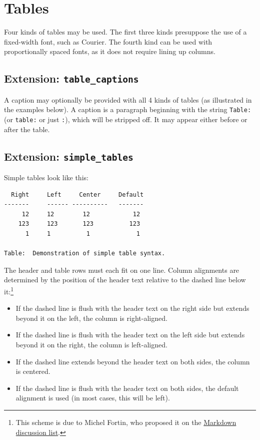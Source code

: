 \documentclass[
  b5paper
]{book}
\providecommand{\tightlist}{%
  \setlength{\itemsep}{0pt}\setlength{\parskip}{0pt}}
\begin{document}
\section{Tables}\label{tables}

Four kinds of tables may be used. The first three kinds presuppose the
use of a fixed-width font, such as Courier. The fourth kind can be used
with proportionally spaced fonts, as it does not require lining up
columns.

\subsection{\texorpdfstring{Extension:
\texttt{table\_captions}}{Extension: table\_captions}}\label{extension-table_captions}

A caption may optionally be provided with all 4 kinds of tables (as
illustrated in the examples below). A caption is a paragraph beginning
with the string \texttt{Table:} (or \texttt{table:} or just \texttt{:}),
which will be stripped off. It may appear either before or after the
table.

\subsection{\texorpdfstring{Extension:
\texttt{simple\_tables}}{Extension: simple\_tables}}\label{extension-simple_tables}

Simple tables look like this:

\begin{verbatim}
  Right     Left     Center     Default
-------     ------ ----------   -------
     12     12        12            12
    123     123       123          123
      1     1          1             1

Table:  Demonstration of simple table syntax.
\end{verbatim}

The header and table rows must each fit on one line. Column alignments
are determined by the position of the header text relative to the dashed
line below it:\footnote{This scheme is due to Michel Fortin, who
  proposed it on the
  \href{http://six.pairlist.net/pipermail/markdown-discuss/2005-March/001097.html}{Markdown
  discussion list}.}

\begin{itemize}
\tightlist
\item
  If the dashed line is flush with the header text on the right side but
  extends beyond it on the left, the column is right-aligned.
\item
  If the dashed line is flush with the header text on the left side but
  extends beyond it on the right, the column is left-aligned.
\item
  If the dashed line extends beyond the header text on both sides, the
  column is centered.
\item
  If the dashed line is flush with the header text on both sides, the
  default alignment is used (in most cases, this will be left).
\end{itemize}
\end{document}
